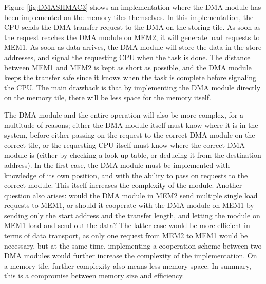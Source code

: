 Figure \ref{fig:DMASHMAC3} shows an implementation where the DMA module has been implemented on the memory tiles themselves.
In this implementation, the CPU sends the DMA transfer request to the DMA on the storing tile.
As soon as the request reaches the DMA module on MEM2, it will generate load requests to MEM1.
As soon as data arrives, the DMA module will store the data in the store addresses, and signal the requesting CPU when the task is done.
The distance between MEM1 and MEM2 is kept as short as possible, and the DMA module keeps the transfer safe since it knows when the task is complete before signaling the CPU.
The main drawback is that by implementing the DMA module directly on the memory tile, there will be less space for the memory itself.

The DMA module and the entire operation will also be more complex, for a multitude of reasons;
either the DMA module itself must know where it is in the system, before either passing on the request to the correct DMA module on the correct tile, or the requesting CPU itself must know where the correct DMA module is (either by checking a look-up table, or deducing it from the destination address).
In the first case, the DMA module must be implemented with knowledge of its own position, and with the ability to pass on requests to the correct module.
This itself increases the complexity of the module. 
Another question also arises: would the DMA module in MEM2 send multiple single load requests to MEM1, or should it cooperate with the DMA module on MEM1 by sending only the start address and the transfer length, and letting the module on MEM1 load and send out the data?
The latter case would be more efficient in terms of data transport, as only one request from MEM2 to MEM1 would be necessary, but at the same time, implementing a cooperation scheme between two DMA modules would further increase the complexity of the implementation.
On a memory tile, further complexity also means less memory space.
In summary, this is a compromise between memory size and efficiency.
 
%


